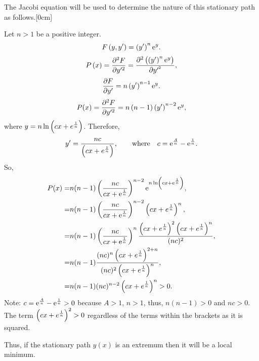 The Jacobi equation will be used to determine the nature of this stationary path as follows.[0cm]

Let $n > 1$ be a positive integer.
\[
	F\left(y,y^\prime\right) = \left(y^\prime\right)^n\mathrm{e}^y.
\]
\[
	P\left(x\right) = \frac{\partial ^2F}{\partial y^{\prime2}} = \frac{\partial ^2\left(\left(y^\prime\right)^n\mathrm{e}^y\right)}{\partial y^{\prime^2}},
\]
\[
	\frac{\partial F}{\partial y^\prime} = n\left(y^\prime\right)^{n-1}\mathrm{e}^y.
\]
\[
	P(x)=\frac{\partial ^2F}{\partial y^{\prime2}} = n\left(n-1\right)\left(y^\prime\right)^{n-2}\mathrm{e}^y,
\]
where $y = n\ln\left(cx + e^{\frac{1}{n}}\right)$. Therefore,
\[
	y^\prime = \frac{nc}{\left(cx + e^{\frac{1}{n}}\right)},\qquad\textrm{where}\quad c=\mathrm{e}^{\frac{A}{n}} - \mathrm{e}^{\frac{1}{n}}.
\]
So,
\begin{align*}
	P(x) =& n(n-1)\left(\dfrac{nc}{cx + \mathrm{e}^{\frac{1}{n}}}\right)^{n-2}\mathrm{e}^{ n\ln\left(cx + e^{\frac{1}{n}}\right)},\\
		 =& n(n-1)\left(\dfrac{nc}{cx + \mathrm{e}^{\frac{1}{n}}}\right)^{n-2}\left(cx + e^{\frac{1}{n}}\right)^n,\\
		 =& n(n-1)\left(\dfrac{nc}{cx + \mathrm{e}^{\frac{1}{n}}}\right)^{n}\frac{\left(cx + e^{\frac{1}{n}}\right)^2\left(cx + e^{\frac{1}{n}}\right)^n}{(nc)^2},\\
		 =& n(n-1)\frac{(nc)^n\left(cx + e^{\frac{1}{n}}\right)^{2+n}}{(nc)^2\left(cx + e^{\frac{1}{n}}\right)^{n}},\\
		 =& n(n-1)(nc)^{n-2}\left(cx + e^{\frac{1}{n}}\right)^{n} > 0.
\end{align*}
Note: $c=\mathrm{e}^{\frac{A}{n}} - \mathrm{e}^{\frac{1}{n}} > 0$ because $A>1$, $n>1$, thus, $n(n-1) > 0$ and $nc>0$. The term $\left(cx + e^{\frac{1}{n}}\right)^{2} > 0$ regardless of the  terms within the brackets as it is squared.

Thus, if the stationary path $y(x)$ is an extremum then it will be a local minimum.

